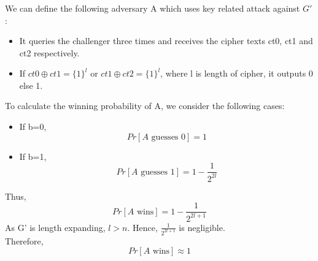 \documentclass{article}
\begin{document}
\subsubsection{}
We can define the following adversary A which uses key related attack against $G'$:
\begin{itemize}
    \item It queries the challenger three times and receives the cipher texts ct0, ct1 and ct2 respectively.
    \item If $ct0 \oplus ct1 = \{1\}^{l}$ or $ct1 \oplus ct2 = \{1\}^{l}$, where l is length of cipher, it outputs 0 else 1.
\end{itemize}
To calculate the winning probability of A, we consider the following cases:
\begin{itemize}
    \item If b=0,
    \[Pr[A \text{ guesses }0]=1\]
    \item If b=1,
    \[Pr[A \text{ guesses }1]=1-\frac{1}{2^{2l}}\]
\end{itemize}
Thus,
\[Pr[A \text{ wins}]= 1- \frac{1}{2^{2l+1}}\]
As G' is length expanding, $l>n$. Hence, $\frac{1}{2^{2l+1}}$ is negligible.\\
Therefore,\[Pr[A \text{ wins}]\approx 1\]
\end{document}
